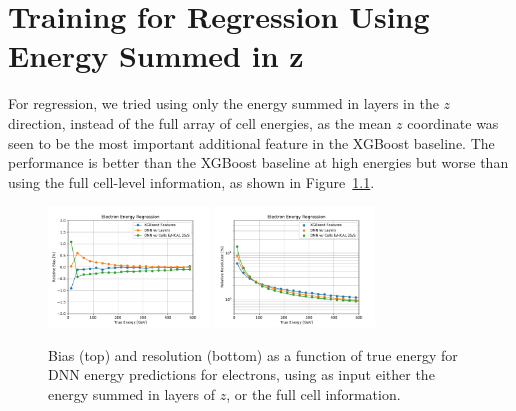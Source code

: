\chapter{Training for Regression Using Energy Summed in z}\label{app:z_sum_regression}

For regression, we tried using only the energy summed in layers in the $z$ direction, instead of the full array of cell energies, as the mean $z$ coordinate was seen to be the most important additional feature in the XGBoost baseline.  The performance is better than the XGBoost baseline at high energies but worse than using the full cell-level information, as shown in Figure~\ref{fig:reg_dnn_inputs}.

\begin{figure}[htbp]
\centering
\includegraphics[width=0.38\textwidth]{Images/Calo/bias_vs_E_EleFixed_nn_inputs_zoom.pdf}
\includegraphics[width=0.38\textwidth]{Images/Calo/res_vs_E_EleFixed_nn_inputs_fits.pdf}
\caption{Bias (top) and resolution (bottom) as a function of true energy for DNN energy predictions for electrons, using as input either the energy summed in layers of $z$, or the full cell information.\label{fig:reg_dnn_inputs}}
\end{figure}